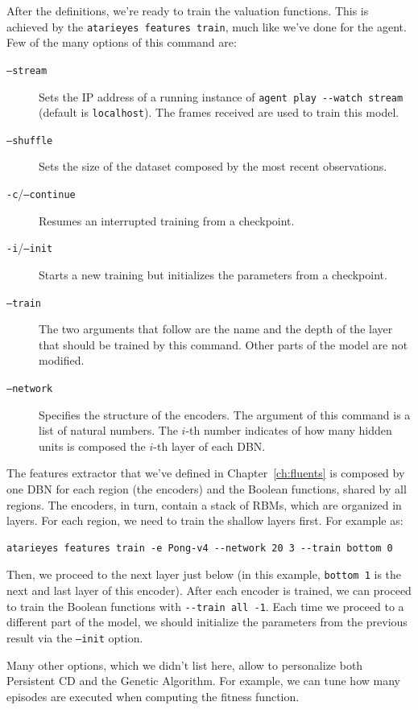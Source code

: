 After the definitions, we're ready to train the valuation functions.
This is achieved by the \verb|atarieyes features train|, much
like we've done for the agent. Few of the many options of this command are:
\begin{description}
	\item [\texttt{--stream}] Sets the IP address of a running instance of
		\verb|agent play --watch stream| (default is \texttt{localhost}). The
		frames received are used to train this model.
	\item [\texttt{--shuffle}] Sets the size of the dataset composed by the most
		recent observations.
	\item [\texttt{-c}/\texttt{--continue}] Resumes an interrupted training from 
		a checkpoint.
	\item [\texttt{-i}/\texttt{--init}] Starts a new training but initializes
		the parameters from a checkpoint.
	\item [\texttt{--train}] The two arguments that follow are the name and the
		depth of the layer that should be trained by this command. Other parts of
		the model are not modified.
	\item [\texttt{--network}] Specifies the structure of the encoders. The
		argument of this command is a list of natural numbers. The $i$-th number
		indicates of how many hidden units is composed the $i$-th layer of each
		DBN.
\end{description}
The features extractor that we've defined in Chapter~\ref{ch:fluents} is
composed by one DBN for each region (the encoders) and the Boolean functions,
shared by all regions. The encoders, in turn, contain a stack of RBMs, which
are organized in layers. For each region, we need to train the shallow layers
first. For example as:
\begin{verbatim}
atarieyes features train -e Pong-v4 --network 20 3 --train bottom 0
\end{verbatim}
Then, we proceed to the next layer just below (in this example,
\verb|bottom 1| is the next and last layer of this encoder). After each
encoder is trained, we can proceed to train the Boolean functions with
\verb|--train all -1|. Each time we proceed to a different part of the model,
we should initialize the parameters from the previous result via the
\texttt{--init} option.

Many other options, which we didn't list here, allow to personalize both
Persistent CD and the Genetic Algorithm. For example, we can tune how many
episodes are executed when computing the fitness function.

